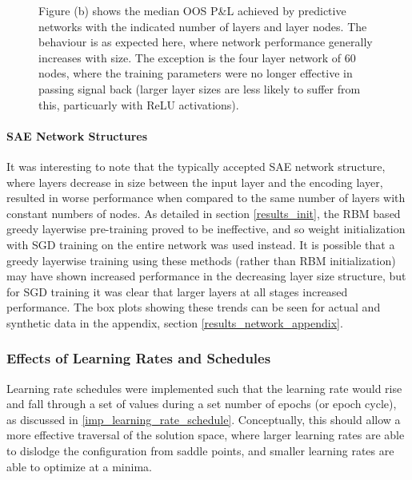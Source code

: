 \documentclass[a4paper,11pt,oneside]{article}
\theoremstyle{plain}
\theoremstyle{definition}
\begin{document}
\begin{figure}[H]
{			\newline Figure (b) shows the median OOS P\&L achieved by predictive networks with the indicated number of layers and layer nodes. The behaviour is as expected here, where network performance generally increases with size. The exception is the four layer network of 60 nodes, where the training parameters were no longer effective in passing signal back (larger layer sizes are less likely to suffer from this, particuarly with ReLU activations).
		}
		\label{figure-network_size}
	\end{figure}
	
	\paragraph{SAE Network Structures}
	
	It was interesting to note that the typically accepted SAE network structure, where layers decrease in size between the input layer and the encoding layer, resulted in worse performance when compared to the same number of layers with constant numbers of nodes. As detailed in section \ref{results_init}, the RBM based greedy layerwise pre-training proved to be ineffective, and so weight initialization with SGD training on the entire network was used instead. It is possible that a greedy layerwise training using these methods (rather than RBM initialization) may have shown increased performance in the decreasing layer size structure, but for SGD training it was clear that larger layers at all stages increased performance. The box plots showing these trends can be seen for actual and synthetic data in the appendix, section \ref{results_network_appendix}.
	
	
	
	\subsubsection{Effects of Learning Rates and Schedules}\label{results_lr}
	
	Learning rate schedules were implemented such that the learning rate would rise and fall through a set of values during a set number of epochs (or epoch cycle), as discussed in \ref{imp_learning_rate_schedule}.	Conceptually, this should allow a more effective traversal of the solution space, where larger learning rates are able to dislodge the configuration from saddle points, and smaller learning rates are able to optimize at a minima. \newline
	
\end{document}
